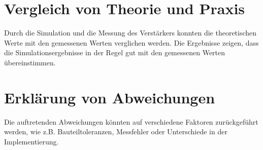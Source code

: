 \section{Vergleich von Theorie und Praxis}
Durch die Simulation und die Messung des Verstärkers konnten die theoretischen Werte mit den gemessenen Werten verglichen werden. Die Ergebnisse zeigen, dass die Simulationsergebnisse in der Regel gut mit den gemessenen Werten übereinstimmen. 
\section{Erklärung von Abweichungen}
Die auftretenden Abweichungen könnten auf verschiedene Faktoren zurückgeführt werden, wie z.B. Bauteiltoleranzen, Messfehler oder Unterschiede in der Implementierung.
\clearpage